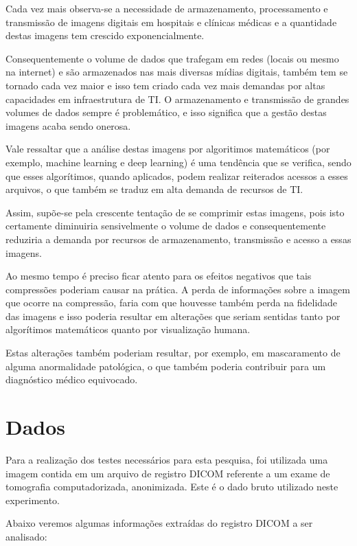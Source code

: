 \documentclass{IEEEtran}
\begin{document}
Cada vez mais observa-se a necessidade de armazenamento, processamento e
transmissão de imagens digitais em hospitais e clínicas médicas e a
quantidade destas imagens tem crescido exponencialmente.

Consequentemente o volume de dados que trafegam em redes (locais ou
mesmo na internet) e são armazenados nas mais diversas mídias digitais,
também tem se tornado cada vez maior e isso tem criado cada vez mais
demandas por altas capacidades em infraestrutura de TI. O armazenamento
e transmissão de grandes volumes de dados sempre é problemático, e isso
significa que a gestão destas imagens acaba sendo onerosa.

Vale ressaltar que a análise destas imagens por algoritimos matemáticos
(por exemplo, machine learning e deep learning) é uma tendência que se
verifica, sendo que esses algorítimos, quando aplicados, podem realizar
reiterados acessos a esses arquivos, o que também se traduz em alta
demanda de recursos de TI.

Assim, supõe-se pela crescente tentação de se comprimir estas imagens,
pois isto certamente diminuiria sensivelmente o volume de dados e
consequentemente reduziria a demanda por recursos de armazenamento,
transmissão e acesso a essas imagens.

Ao mesmo tempo é preciso ficar atento para os efeitos negativos que tais
compressões poderiam causar na prática. A perda de informações sobre a
imagem que ocorre na compressão, faria com que houvesse também perda na
fidelidade das imagens e isso poderia resultar em alterações que seriam
sentidas tanto por algorítimos matemáticos quanto por visualização
humana.

Estas alterações também poderiam resultar, por exemplo, em mascaramento
de alguma anormalidade patológica, o que também poderia contribuir para
um diagnóstico médico equivocado.

    \section{Dados}\label{dados}

    Para a realização dos testes necessários para esta pesquisa, foi
utilizada uma imagem contida em um arquivo de registro DICOM referente a
um exame de tomografia computadorizada, anonimizada. Este é o dado bruto
utilizado neste experimento.



    Abaixo veremos algumas informações extraídas do registro DICOM a ser
analisado:
\end{document}
